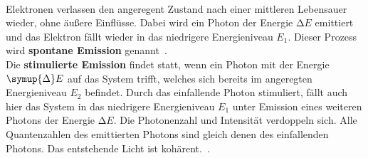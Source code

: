         \\
        Elektronen verlassen den angeregent Zustand nach einer mittleren Lebensauer wieder, ohne äußere Einflüsse.
        Dabei wird ein Photon der Energie $\increment E$ emittiert und das Elektron fällt wieder in das niedrigere Energieniveau $E_1$.
        Dieser Prozess wird \textbf{spontane Emission} genannt~\cite[60]{haken_wolf_2004}.
        \\
        Die \textbf{stimulierte Emission} findet statt, wenn ein Photon mit der Energie $\symup{\Delta}E$ auf das System trifft, welches sich bereits im angeregten Energieniveau $E_2$ befindet. 
        Durch das einfallende Photon stimuliert, fällt auch hier das System in das niedrigere Energieniveau $E_1$ unter Emission eines weiteren Photons der Energie $\increment E$.
        Die Photonenzahl und Intensität verdoppeln sich.
        Alle Quantenzahlen des emittierten Photons sind gleich denen des einfallenden Photons.
        Das entstehende Licht ist kohärent.~\cite[31]{eichler_2015}.
        
